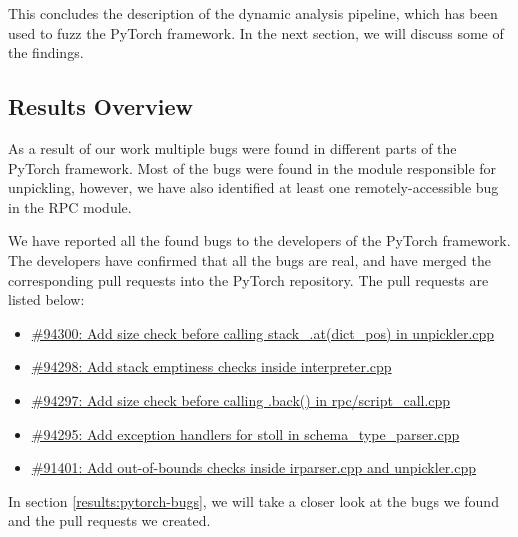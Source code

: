 This concludes the description of the dynamic analysis pipeline, which has been used to fuzz the PyTorch framework. In the next section, we will discuss some of the findings.

\subsection{Results Overview}

As a result of our work multiple bugs were found in different parts of the PyTorch framework. Most of the bugs were found in the module responsible for unpickling, however, we have also identified at least one remotely-accessible bug in the RPC module.

We have reported all the found bugs to the developers of the PyTorch framework. The developers have confirmed that all the bugs are real, and have merged the corresponding pull requests into the PyTorch repository. The pull requests are listed below:

\begin{itemize}
    \item \href{https://github.com/pytorch/pytorch/pull/94300}{\#94300: Add size check before calling stack\_.at(dict\_pos) in unpickler.cpp}
    \item \href{https://github.com/pytorch/pytorch/pull/94298}{\#94298: Add stack emptiness checks inside interpreter.cpp}
    \item \href{https://github.com/pytorch/pytorch/pull/94297}{\#94297: Add size check before calling .back() in rpc/script\_call.cpp}
    \item \href{https://github.com/pytorch/pytorch/pull/94295}{\#94295: Add exception handlers for stoll in schema\_type\_parser.cpp}
    \item \href{https://github.com/pytorch/pytorch/pull/91401}{\#91401: Add out-of-bounds checks inside irparser.cpp and unpickler.cpp}
\end{itemize}

In section \ref{results:pytorch-bugs}, we will take a closer look at the bugs we found and the pull requests we created.
